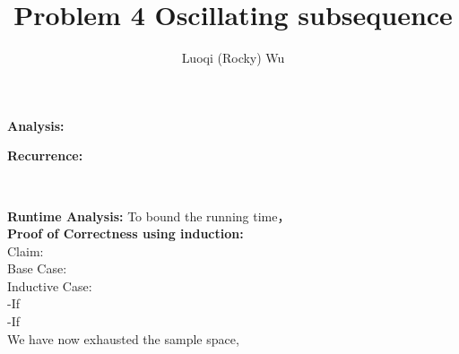 \documentclass[12pt]{article}
\title{Problem 4 Oscillating subsequence}
\author{Luoqi (Rocky) Wu}
\begin{document}
\maketitle

\textbf{Analysis:}

\textbf{Recurrence:}


\pagebreak

\begin{algorithm}
\caption{}
\KwIn{}
\KwOut{}
\hrulefill\\

\nl \tcp*[r]{}
\nl 

\nl {} {
	\nl {}
        }
\nl \Return{}
\end{algorithm}

\pagebreak

\textbf{Runtime Analysis:} To bound the running time， \\

\textbf{Proof of Correctness using induction:} \\

Claim: \\

Base Case: \\

Inductive Case: \\

-If \\

-If \\

We have now exhausted the sample space, \\
\end{document}
